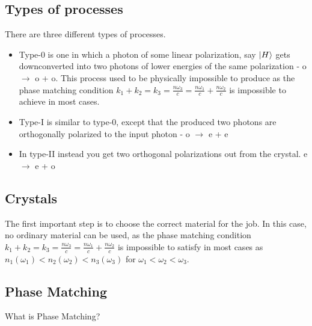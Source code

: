 \documentclass{article}
\begin{document}
\subsection{Types of processes}
There are three different types of processes.
\begin{itemize}
	\item Type-0 is one in which a photon of some linear polarization, say $\ket{H}$ gets downconverted
into two photons of lower energies of the same polarization - o $\rightarrow$ o + o. This process used to be physically impossible to produce 
as the phase matching condition $k_1 + k_2 = k_3 = \frac{n \omega_3}{c} = \frac{n \omega_1}{c} + \frac{n \omega_2}{c}$ is impossible to achieve
in most cases.
	\item Type-I is similar to type-0, except that the produced two photons are orthogonally polarized to the input photon - o $\rightarrow$ e + e
	\item In type-II instead you get two orthogonal polarizations out from the crystal. e $\rightarrow$ e + o
\end{itemize}

\subsection{Crystals}
The first important step is to choose the correct material for the job. In this case, no ordinary material can be used, 
as the phase matching condition $k_1 + k_2 = k_3 = \frac{n \omega_3}{c} = \frac{n \omega_1}{c} + \frac{n \omega_2}{c}$ is impossible
to satisfy in most cases as $n_1 \left(	\omega_1 \right) < n_2 \left(	\omega_2 \right) < n_3 \left(	\omega_3 \right)$ for $\omega_1 < \omega_2 < \omega_3$.

\subsection{Phase Matching}
What is Phase Matching? %
\end{document}
